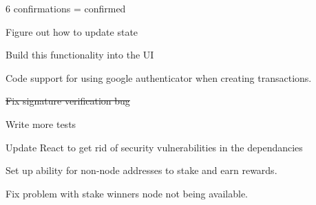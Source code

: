 \begin{DoxyItemize}
\begin{DoxyItemize}
\item 6 confirmations = confirmed
\item Figure out how to update state
\item Build this functionality into the UI
\end{DoxyItemize}
\item Code support for using google authenticator when creating transactions.
\item \sout{Fix signature verification bug}
\item Write more tests
\item Update React to get rid of security vulnerabilities in the dependancies
\item Set up ability for non-\/node addresses to stake and earn rewards.
\begin{DoxyItemize}
\item Fix problem with stake winner\textquotesingle{}s node not being available. 
\end{DoxyItemize}
\end{DoxyItemize}
